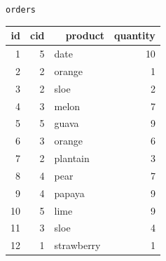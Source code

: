 \documentclass[
]{beamer}
\begin{document}
\begin{frame}[containsverbatim]
\begin{minipage}[c]{0.45\textwidth}
        \normalsize \texttt{orders}
        \vspace{0.1cm}
        
        \tiny
        \begin{tabular}{ |r|r|l|r| }
        \hline
            id & cid & ~~product & quantity \\
        \hline
            1 & 5 & date & 10 \\
            2 & 2 & orange & 1 \\
            3 & 2 & sloe & 2 \\
            4 & 3 & melon & 7 \\
            5 & 5 & guava & 9 \\
            6 & 3 & orange & 6 \\
            7 & 2 & plantain & 3 \\
            8 & 4 & pear & 7 \\
            9 & 4 & papaya & 9 \\
            10 & 5 & lime & 9 \\
            11 & 3 & sloe & 4 \\
            12 & 1 & strawberry & 1 \\
        \hline
        \end{tabular}
    \end{minipage}
\end{frame}
\end{document}
